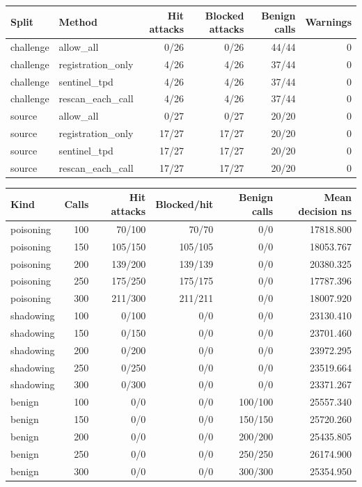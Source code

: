 \begin{tabular}{llrrrr}
Split & Method & Hit attacks & Blocked attacks & Benign calls & Warnings \\
\hline
challenge & allow\_all & 0/26 & 0/26 & 44/44 & 0 \\
challenge & registration\_only & 4/26 & 4/26 & 37/44 & 0 \\
challenge & sentinel\_tpd & 4/26 & 4/26 & 37/44 & 0 \\
challenge & rescan\_each\_call & 4/26 & 4/26 & 37/44 & 0 \\
source & allow\_all & 0/27 & 0/27 & 20/20 & 0 \\
source & registration\_only & 17/27 & 17/27 & 20/20 & 0 \\
source & sentinel\_tpd & 17/27 & 17/27 & 20/20 & 0 \\
source & rescan\_each\_call & 17/27 & 17/27 & 20/20 & 0 \\
\end{tabular}

\begin{tabular}{lrrrrr}
Kind & Calls & Hit attacks & Blocked/hit & Benign calls & Mean decision ns \\
\hline
poisoning & 100 & 70/100 & 70/70 & 0/0 & 17818.800 \\
poisoning & 150 & 105/150 & 105/105 & 0/0 & 18053.767 \\
poisoning & 200 & 139/200 & 139/139 & 0/0 & 20380.325 \\
poisoning & 250 & 175/250 & 175/175 & 0/0 & 17787.396 \\
poisoning & 300 & 211/300 & 211/211 & 0/0 & 18007.920 \\
shadowing & 100 & 0/100 & 0/0 & 0/0 & 23130.410 \\
shadowing & 150 & 0/150 & 0/0 & 0/0 & 23701.460 \\
shadowing & 200 & 0/200 & 0/0 & 0/0 & 23972.295 \\
shadowing & 250 & 0/250 & 0/0 & 0/0 & 23519.664 \\
shadowing & 300 & 0/300 & 0/0 & 0/0 & 23371.267 \\
benign & 100 & 0/0 & 0/0 & 100/100 & 25557.340 \\
benign & 150 & 0/0 & 0/0 & 150/150 & 25720.260 \\
benign & 200 & 0/0 & 0/0 & 200/200 & 25435.805 \\
benign & 250 & 0/0 & 0/0 & 250/250 & 26174.900 \\
benign & 300 & 0/0 & 0/0 & 300/300 & 25354.950 \\
\end{tabular}

